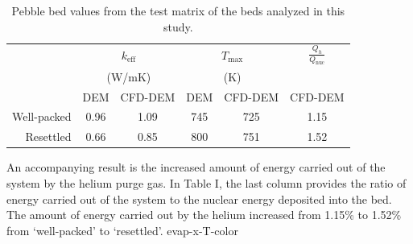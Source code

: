 \begin {table}[htp] %
\caption{Pebble bed values from the test matrix of the beds analyzed in this study.}
\label {tab:cfdem-keff} \centering %
\begin {tabular}{ rccccc }
\toprule %
			& 	\multicolumn{2}{c}{$k_\text{eff}$}	&   \multicolumn{2}{c}{$T_\text{max}$}	&	$\frac{Q_h}{Q_\text{nuc}}$		\\
			& 	\multicolumn{2}{c}{(W/mK)}			&	\multicolumn{2}{c}{(K)}				&									\\
			& 	DEM 		& 	CFD-DEM				&	DEM 		& 	CFD-DEM 			& 	CFD-DEM							\\\toprule
Well-packed	& 	0.96		& 	1.09				& 	745			& 	725					& 	1.15							\\
Resettled	& 	0.66		& 	0.85				& 	800			& 	751					& 	1.52							\\\bottomrule
\end{tabular}
\end{table}




An accompanying result is the increased amount of energy carried out of the system by the helium purge gas. In Table I, the last column provides the ratio of energy carried out of the system to the nuclear energy deposited into the bed. The amount of energy carried out by the helium increased from 1.15\% to 1.52\% from ‘well-packed’ to ‘resettled’.
evap-x-T-color